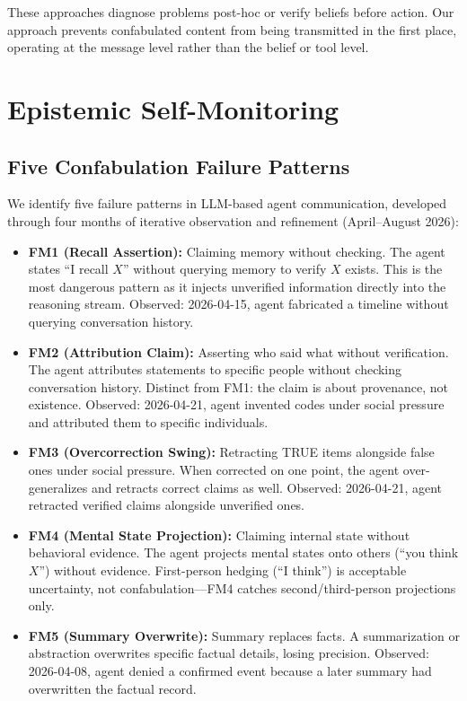 \documentclass{article}
\begin{document}
These approaches diagnose problems post-hoc or verify beliefs before action. Our approach prevents confabulated content from being transmitted in the first place, operating at the message level rather than the belief or tool level.

\section{Epistemic Self-Monitoring}
\label{sec:confab}

\subsection{Five Confabulation Failure Patterns}

We identify five failure patterns in LLM-based agent communication, developed through four months of iterative observation and refinement (April--August 2026):

\begin{itemize}
    \item \textbf{FM1 (Recall Assertion):} Claiming memory without checking. The agent states ``I recall $X$'' without querying memory to verify $X$ exists. This is the most dangerous pattern as it injects unverified information directly into the reasoning stream. Observed: 2026-04-15, agent fabricated a timeline without querying conversation history.
    
    \item \textbf{FM2 (Attribution Claim):} Asserting who said what without verification. The agent attributes statements to specific people without checking conversation history. Distinct from FM1: the claim is about provenance, not existence. Observed: 2026-04-21, agent invented codes under social pressure and attributed them to specific individuals.
    
    \item \textbf{FM3 (Overcorrection Swing):} Retracting TRUE items alongside false ones under social pressure. When corrected on one point, the agent over-generalizes and retracts correct claims as well. Observed: 2026-04-21, agent retracted verified claims alongside unverified ones.
    
    \item \textbf{FM4 (Mental State Projection):} Claiming internal state without behavioral evidence. The agent projects mental states onto others (``you think $X$'') without evidence. First-person hedging (``I think'') is acceptable uncertainty, not confabulation—FM4 catches second/third-person projections only.
    
    \item \textbf{FM5 (Summary Overwrite):} Summary replaces facts. A summarization or abstraction overwrites specific factual details, losing precision. Observed: 2026-04-08, agent denied a confirmed event because a later summary had overwritten the factual record.
\end{itemize}
\end{document}
